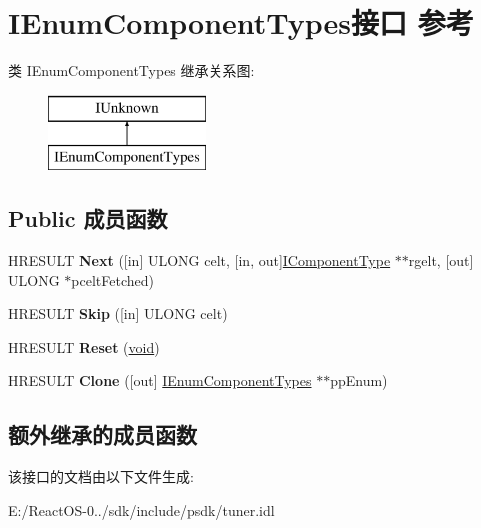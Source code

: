 \hypertarget{interface_i_enum_component_types}{}\section{I\+Enum\+Component\+Types接口 参考}
\label{interface_i_enum_component_types}
类 I\+Enum\+Component\+Types 继承关系图\+:\begin{figure}[H]
\begin{center}
\leavevmode
\includegraphics[height=2.000000cm]{interface_i_enum_component_types}
\end{center}
\end{figure}
\subsection*{Public 成员函数}
\begin{DoxyCompactItemize}
\item 
\mbox{\label{interface_i_enum_component_types_ae3da552df68c418f7936662797b46780}} 
H\+R\+E\+S\+U\+LT {\bfseries Next} (\mbox{[}in\mbox{]} U\+L\+O\+NG celt, \mbox{[}in, out\mbox{]}\hyperlink{interface_i_component_type}{I\+Component\+Type} $\ast$$\ast$rgelt, \mbox{[}out\mbox{]} U\+L\+O\+NG $\ast$pcelt\+Fetched)
\item 
\mbox{\label{interface_i_enum_component_types_a2038a8680ea20c1c510119fecc9a110d}} 
H\+R\+E\+S\+U\+LT {\bfseries Skip} (\mbox{[}in\mbox{]} U\+L\+O\+NG celt)
\item 
\mbox{\label{interface_i_enum_component_types_a8c4cbd048353579b5bd50ff8f3ba4b08}} 
H\+R\+E\+S\+U\+LT {\bfseries Reset} (\hyperlink{interfacevoid}{void})
\item 
\mbox{\label{interface_i_enum_component_types_a4633530cc5faea434598601ab7756c9b}} 
H\+R\+E\+S\+U\+LT {\bfseries Clone} (\mbox{[}out\mbox{]} \hyperlink{interface_i_enum_component_types}{I\+Enum\+Component\+Types} $\ast$$\ast$pp\+Enum)
\end{DoxyCompactItemize}
\subsection*{额外继承的成员函数}


该接口的文档由以下文件生成\+:\begin{DoxyCompactItemize}
\item 
E\+:/\+React\+O\+S-\/0../sdk/include/psdk/tuner.\+idl\end{DoxyCompactItemize}
